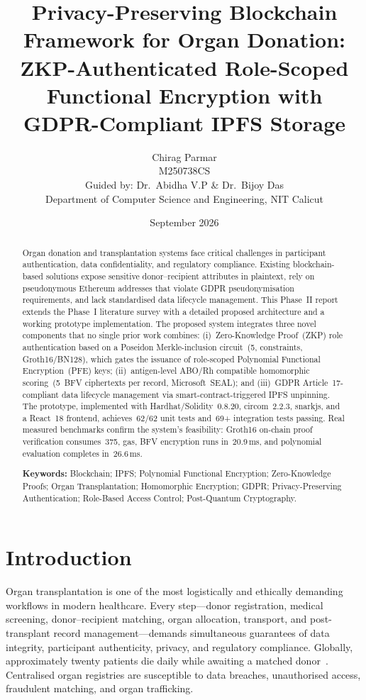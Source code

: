 \documentclass[10pt,twocolumn,a4paper]{article}
\title{\large\textbf{Privacy-Preserving Blockchain Framework for Organ Donation:%
 ZKP-Authenticated Role-Scoped Functional Encryption with%
 GDPR-Compliant IPFS Storage}}
\author{
  \normalsize Chirag Parmar\\
  \small M250738CS\\[2pt]
  \normalsize Guided by: Dr.~Abidha V.P \& Dr.~Bijoy Das\\
  \small Department of Computer Science and Engineering, NIT Calicut
}
\date{September 2026}
\begin{document}
\maketitle
\thispagestyle{empty}

\begin{abstract}
\noindent
Organ donation and transplantation systems face critical challenges in participant
authentication, data confidentiality, and regulatory compliance. Existing
blockchain-based solutions expose sensitive donor--recipient attributes in plaintext,
rely on pseudonymous Ethereum addresses that violate GDPR pseudonymisation
requirements, and lack standardised data lifecycle management. This Phase~II report
extends the Phase~I literature survey with a detailed proposed architecture and a
working prototype implementation. The proposed system integrates three novel components
that no single prior work combines: (i)~Zero-Knowledge Proof~(ZKP) role
authentication based on a Poseidon Merkle-inclusion circuit~(5, constraints,
Groth16/BN128), which gates the issuance of role-scoped Polynomial Functional
Encryption~(PFE) keys; (ii)~antigen-level ABO/Rh compatible homomorphic
scoring~(5~BFV ciphertexts per record, Microsoft~SEAL); and (iii)~GDPR
Article~17-compliant data lifecycle management via smart-contract-triggered IPFS
unpinning. The prototype, implemented with Hardhat/Solidity~0.8.20, circom~2.2.3,
snarkjs, and a React~18 frontend, achieves~62/62 unit tests and~69+ integration tests
passing. Real measured benchmarks confirm the system's feasibility: Groth16
on-chain proof verification consumes~375, gas, BFV encryption runs in~20.9\,ms,
and polynomial evaluation completes in~26.6\,ms.

\smallskip\noindent
\textbf{Keywords:} Blockchain; IPFS; Polynomial Functional Encryption; Zero-Knowledge
Proofs; Organ Transplantation; Homomorphic Encryption; GDPR; Privacy-Preserving
Authentication; Role-Based Access Control; Post-Quantum Cryptography.
\end{abstract}

\section{Introduction}

Organ transplantation is one of the most logistically and ethically demanding
workflows in modern healthcare. Every step---donor registration, medical screening,
donor--recipient matching, organ allocation, transport, and post-transplant record
management---demands simultaneous guarantees of data integrity, participant
authenticity, privacy, and regulatory compliance. Globally, approximately twenty
patients die daily while awaiting a matched donor~\cite{hawashin2022}. Centralised
organ registries are susceptible to data breaches, unauthorised access, fraudulent
matching, and organ trafficking.
\end{document}
